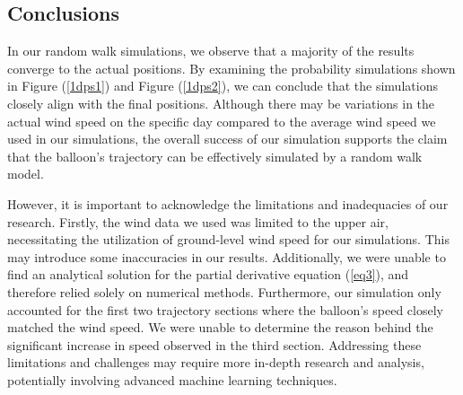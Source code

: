 \documentclass{article}
\begin{document}
\begin{multicols}{2}
\section{Conclusions}
In our random walk simulations, we observe that a majority of the results converge to the actual positions. By examining the probability simulations shown in Figure (\ref{1dps1}) and Figure (\ref{1dps2}), we can conclude that the simulations closely align with the final positions. Although there may be variations in the actual wind speed on the specific day compared to the average wind speed we used in our simulations, the overall success of our simulation supports the claim that the balloon's trajectory can be effectively simulated by a random walk model.

However, it is important to acknowledge the limitations and inadequacies of our research. Firstly, the wind data we used was limited to the upper air, necessitating the utilization of ground-level wind speed for our simulations. This may introduce some inaccuracies in our results. Additionally, we were unable to find an analytical solution for the partial derivative equation (\ref{eq3}), and therefore relied solely on numerical methods. Furthermore, our simulation only accounted for the first two trajectory sections where the balloon's speed closely matched the wind speed. We were unable to determine the reason behind the significant increase in speed observed in the third section. Addressing these limitations and challenges may require more in-depth research and analysis, potentially involving advanced machine learning techniques.
\end{multicols}
\nocite{*}


\end{document}
